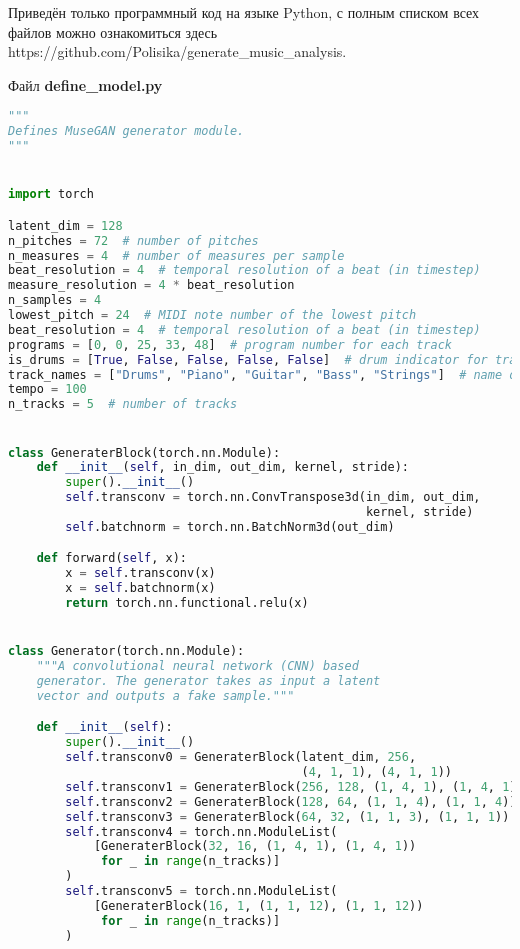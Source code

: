 \appendix

Приведён только программный код на языке Python, с полным списком всех файлов можно ознакомиться здесь https://github.com/Polisika/generate\_music\_analysis. 

\lstset{
  basicstyle=\footnotesize,        %
}

Файл \textbf{define\_model.py}

\begin{lstlisting}[language=Python]
"""
Defines MuseGAN generator module.
"""


import torch

latent_dim = 128
n_pitches = 72  # number of pitches
n_measures = 4  # number of measures per sample
beat_resolution = 4  # temporal resolution of a beat (in timestep)
measure_resolution = 4 * beat_resolution
n_samples = 4
lowest_pitch = 24  # MIDI note number of the lowest pitch
beat_resolution = 4  # temporal resolution of a beat (in timestep)
programs = [0, 0, 25, 33, 48]  # program number for each track
is_drums = [True, False, False, False, False]  # drum indicator for tracks
track_names = ["Drums", "Piano", "Guitar", "Bass", "Strings"]  # name of each track
tempo = 100
n_tracks = 5  # number of tracks


class GeneraterBlock(torch.nn.Module):
    def __init__(self, in_dim, out_dim, kernel, stride):
        super().__init__()
        self.transconv = torch.nn.ConvTranspose3d(in_dim, out_dim, 
                                                  kernel, stride)
        self.batchnorm = torch.nn.BatchNorm3d(out_dim)

    def forward(self, x):
        x = self.transconv(x)
        x = self.batchnorm(x)
        return torch.nn.functional.relu(x)


class Generator(torch.nn.Module):
    """A convolutional neural network (CNN) based
    generator. The generator takes as input a latent
    vector and outputs a fake sample."""

    def __init__(self):
        super().__init__()
        self.transconv0 = GeneraterBlock(latent_dim, 256,
                                         (4, 1, 1), (4, 1, 1))
        self.transconv1 = GeneraterBlock(256, 128, (1, 4, 1), (1, 4, 1))
        self.transconv2 = GeneraterBlock(128, 64, (1, 1, 4), (1, 1, 4))
        self.transconv3 = GeneraterBlock(64, 32, (1, 1, 3), (1, 1, 1))
        self.transconv4 = torch.nn.ModuleList(
            [GeneraterBlock(32, 16, (1, 4, 1), (1, 4, 1))
             for _ in range(n_tracks)]
        )
        self.transconv5 = torch.nn.ModuleList(
            [GeneraterBlock(16, 1, (1, 1, 12), (1, 1, 12))
             for _ in range(n_tracks)]
        )


\end{lstlisting}
